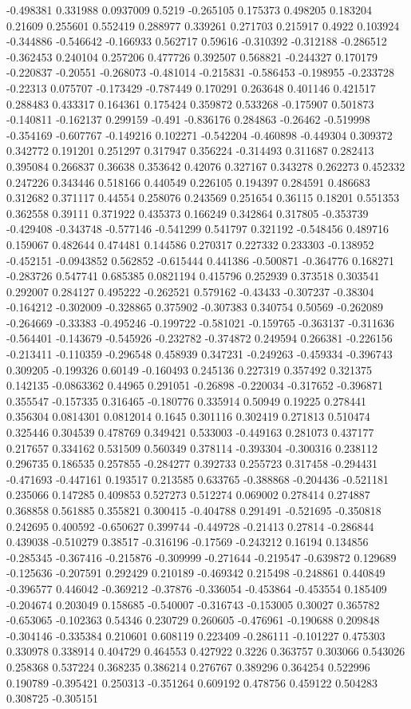 -0.498381 0.331988 0.0937009 0.5219 -0.265105 0.175373 0.498205 0.183204 0.21609 0.255601 0.552419 0.288977 0.339261 0.271703 0.215917 0.4922 0.103924 -0.344886 -0.546642 -0.166933 0.562717 0.59616 -0.310392 -0.312188 -0.286512 -0.362453 0.240104 0.257206 0.477726 0.392507 0.568821 -0.244327 0.170179 -0.220837 -0.20551 -0.268073 -0.481014 -0.215831 -0.586453 -0.198955 -0.233728 -0.22313 0.075707 -0.173429 -0.787449 0.170291 0.263648 0.401146 0.421517 0.288483 0.433317 0.164361 0.175424 0.359872 0.533268 -0.175907 0.501873 -0.140811 -0.162137 0.299159 -0.491 -0.836176 0.284863 -0.26462 -0.519998 -0.354169 -0.607767 -0.149216 0.102271 -0.542204 -0.460898 -0.449304 0.309372 0.342772 0.191201 0.251297 0.317947 0.356224 -0.314493 0.311687 0.282413 0.395084 0.266837 0.36638 0.353642 0.42076 0.327167 0.343278 0.262273 0.452332 0.247226 0.343446 0.518166 0.440549 0.226105 0.194397 0.284591 0.486683 0.312682 0.371117 0.44554 0.258076 0.243569 0.251654 0.36115 0.18201 0.551353 0.362558 0.39111 0.371922 0.435373 0.166249 0.342864 0.317805 -0.353739 -0.429408 -0.343748 -0.577146 -0.541299 0.541797 0.321192 -0.548456 0.489716 0.159067 0.482644 0.474481 0.144586 0.270317 0.227332 0.233303 -0.138952 -0.452151 -0.0943852 0.562852 -0.615444 0.441386 -0.500871 -0.364776 0.168271 -0.283726 0.547741 0.685385 0.0821194 0.415796 0.252939 0.373518 0.303541 0.292007 0.284127 0.495222 -0.262521 0.579162 -0.43433 -0.307237 -0.38304 -0.164212 -0.302009 -0.328865 0.375902 -0.307383 0.340754 0.50569 -0.262089 -0.264669 -0.33383 -0.495246 -0.199722 -0.581021 -0.159765 -0.363137 -0.311636 -0.564401 -0.143679 -0.545926 -0.232782 -0.374872 0.249594 0.266381 -0.226156 -0.213411 -0.110359 -0.296548 0.458939 0.347231 -0.249263 -0.459334 -0.396743 0.309205 -0.199326 0.60149 -0.160493 0.245136 0.227319 0.357492 0.321375 0.142135 -0.0863362 0.44965 0.291051 -0.26898 -0.220034 -0.317652 -0.396871 0.355547 -0.157335 0.316465 -0.180776 0.335914 0.50949 0.19225 0.278441 0.356304 0.0814301 0.0812014 0.1645 0.301116 0.302419 0.271813 0.510474 0.325446 0.304539 0.478769 0.349421 0.533003 -0.449163 0.281073 0.437177 0.217657 0.334162 0.531509 0.560349 0.378114 -0.393304 -0.300316 0.238112 0.296735 0.186535 0.257855 -0.284277 0.392733 0.255723 0.317458 -0.294431 -0.471693 -0.447161 0.193517 0.213585 0.633765 -0.388868 -0.204436 -0.521181 0.235066 0.147285 0.409853 0.527273 0.512274 0.069002 0.278414 0.274887 0.368858 0.561885 0.355821 0.300415 -0.404788 0.291491 -0.521695 -0.350818 0.242695 0.400592 -0.650627 0.399744 -0.449728 -0.21413 0.27814 -0.286844 0.439038 -0.510279 0.38517 -0.316196 -0.17569 -0.243212 0.16194 0.134856 -0.285345 -0.367416 -0.215876 -0.309999 -0.271644 -0.219547 -0.639872 0.129689 -0.125636 -0.207591 0.292429 0.210189 -0.469342 0.215498 -0.248861 0.440849 -0.396577 0.446042 -0.369212 -0.37876 -0.336054 -0.453864 -0.453554 0.185409 -0.204674 0.203049 0.158685 -0.540007 -0.316743 -0.153005 0.30027 0.365782 -0.653065 -0.102363 0.54346 0.230729 0.260605 -0.476961 -0.190688 0.209848 -0.304146 -0.335384 0.210601 0.608119 0.223409 -0.286111 -0.101227 0.475303 0.330978 0.338914 0.404729 0.464553 0.427922 0.3226 0.363757 0.303066 0.543026 0.258368 0.537224 0.368235 0.386214 0.276767 0.389296 0.364254 0.522996 0.190789 -0.395421 0.250313 -0.351264 0.609192 0.478756 0.459122 0.504283 0.308725 -0.305151 
